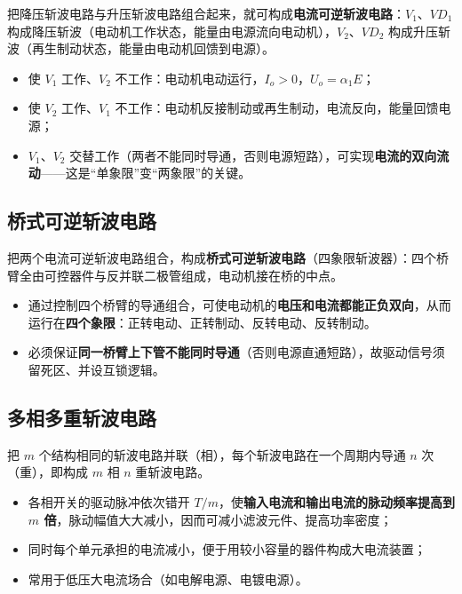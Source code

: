 把降压斩波电路与升压斩波电路组合起来，就可构成\textbf{电流可逆斩波电路}：$V_1$、$VD_1$ 构成降压斩波（电动机工作状态，能量由电源流向电动机），$V_2$、$VD_2$ 构成升压斩波（再生制动状态，能量由电动机回馈到电源）。

\begin{itemize}
  \item 使 $V_1$ 工作、$V_2$ 不工作：电动机电动运行，$I_o>0$，$U_o=\alpha_1E$；
  \item 使 $V_2$ 工作、$V_1$ 不工作：电动机反接制动或再生制动，电流反向，能量回馈电源；
  \item $V_1$、$V_2$ 交替工作（两者不能同时导通，否则电源短路），可实现\textbf{电流的双向流动}——这是“单象限”变“两象限”的关键。
\end{itemize}

\subsection{桥式可逆斩波电路}

把两个电流可逆斩波电路组合，构成\textbf{桥式可逆斩波电路}（四象限斩波器）：四个桥臂全由可控器件与反并联二极管组成，电动机接在桥的中点。

\begin{itemize}
  \item 通过控制四个桥臂的导通组合，可使电动机的\textbf{电压和电流都能正负双向}，从而运行在\textbf{四个象限}：正转电动、正转制动、反转电动、反转制动。
  \item 必须保证\textbf{同一桥臂上下管不能同时导通}（否则电源直通短路），故驱动信号须留死区、并设互锁逻辑。
\end{itemize}

\subsection{多相多重斩波电路}

把 $m$ 个结构相同的斩波电路并联（相），每个斩波电路在一个周期内导通 $n$ 次（重），即构成 $m$ 相 $n$ 重斩波电路。

\begin{itemize}
  \item 各相开关的驱动脉冲依次错开 $T/m$，使\textbf{输入电流和输出电流的脉动频率提高到 $m$ 倍}，脉动幅值大大减小，因而可减小滤波元件、提高功率密度；
  \item 同时每个单元承担的电流减小，便于用较小容量的器件构成大电流装置；
  \item 常用于低压大电流场合（如电解电源、电镀电源）。
\end{itemize}

